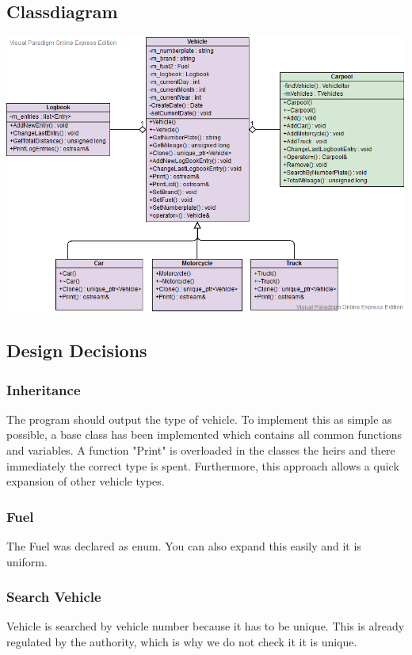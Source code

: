 \subsection{Classdiagram}
\includegraphics[scale=0.65]{ClassDiagram}

\subsection{Design Decisions}
\subsubsection{Inheritance}
The program should output the type of vehicle. To implement this as simple as possible, a base class has been implemented which contains all common functions and variables. A function "Print" is overloaded in the classes the heirs and there immediately the correct type is spent.
Furthermore, this approach allows a quick expansion of other vehicle types.

\subsubsection{Fuel}
The Fuel was declared as enum. You can also expand this easily and it is uniform.

\subsubsection{Search Vehicle}
Vehicle is searched by vehicle number because it has to be unique. This is already regulated by the authority, which is why we do not check it it is unique.

